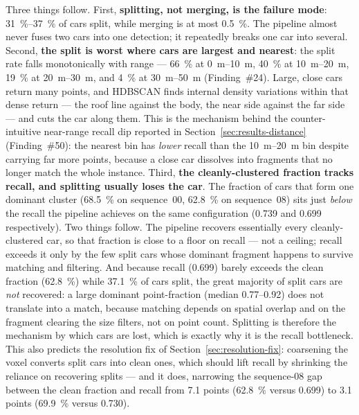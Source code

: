 Three things follow. First, \textbf{splitting, not merging, is the failure mode}:
\SIrange{31}{37}{\percent} of cars split, while merging is at most
\SI{0.5}{\percent}. The pipeline almost never fuses two cars into one detection; it
repeatedly breaks one car into several. Second, \textbf{the split is worst where
cars are largest and nearest}: the split rate falls monotonically with range ---
\SI{66}{\percent} at \SIrange{0}{10}{\metre}, \SI{40}{\percent} at
\SIrange{10}{20}{\metre}, \SI{19}{\percent} at \SIrange{20}{30}{\metre}, and
\SI{4}{\percent} at \SIrange{30}{50}{\metre} (Finding~\#24). Large, close cars return many points, and
HDBSCAN finds internal density variations within that dense return --- the roof line
against the body, the near side against the far side --- and cuts the car along
them. This is the mechanism behind the counter-intuitive near-range recall dip
reported in Section~\ref{sec:results-distance} (Finding~\#50): the nearest bin has \emph{lower} recall than
the \SIrange{10}{20}{\metre} bin despite carrying far more points, because a close
car dissolves into fragments that no longer match the whole instance. Third,
\textbf{the cleanly-clustered fraction tracks recall, and splitting usually loses
the car}. The fraction of cars that form one dominant cluster
(\SI{68.5}{\percent} on sequence~00, \SI{62.8}{\percent} on sequence~08) sits just
\emph{below} the recall the pipeline achieves on the same configuration
(\num{0.739} and \num{0.699} respectively). Two things follow. The pipeline recovers
essentially every cleanly-clustered car, so that fraction is close to a floor on
recall --- not a ceiling; recall exceeds it only by the few split cars whose dominant
fragment happens to survive matching and filtering. And because recall
(\num{0.699}) barely exceeds the clean fraction (\SI{62.8}{\percent}) while
\SI{37.1}{\percent} of cars split, the great majority of split cars are \emph{not}
recovered: a large dominant point-fraction (median \num{0.77}--\num{0.92}) does not
translate into a match, because matching depends on spatial overlap and on the
fragment clearing the size filters, not on point count. Splitting is therefore the
mechanism by which cars are lost, which is exactly why it is the recall bottleneck.
This also predicts the resolution fix of Section~\ref{sec:resolution-fix}: coarsening
the voxel converts split cars into clean ones, which should lift recall by shrinking
the reliance on recovering splits --- and it does, narrowing the sequence-08 gap
between the clean fraction and recall from \num{7.1} points (\SI{62.8}{\percent}
versus \num{0.699}) to \num{3.1} points (\SI{69.9}{\percent} versus \num{0.730}).


